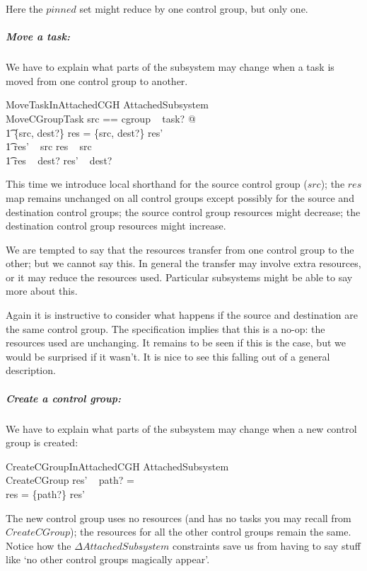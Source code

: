 \documentclass[a4paper,twoside,12pt]{article}
\begin{document}
Here the $pinned$ set might reduce by one control group, but only one.

\subparagraph{Move a task:}
We have to explain what parts of the subsystem may change when a task is moved from one control group to another.

\begin{schema}{MoveTaskInAttachedCGH}
\Delta AttachedSubsystem \\
MoveCGroupTask
\where
\LET src == cgroup ~ task? @ \\
\t1 \{src, dest?\} \ndres res = \{src, dest?\} \ndres res' \land \\
\t1 res' ~ src \subseteq res ~ src \land \\
\t1 res ~ dest? \subseteq res' ~ dest?
\end{schema}
This time we introduce local shorthand for the source control group ($src$);
the $res$ map remains unchanged on all control groups except possibly for the source and destination control groups;
the source control group resources might decrease;
the destination control group resources might increase.

We are tempted to say that the resources transfer from one control group to the other; but we cannot say this.
In general the transfer may involve extra resources, or it may reduce the resources used. Particular
subsystems might be able to say more about this.

Again it is instructive to consider what happens if the source and destination are the same control group. The specification implies that this is a no-op: the resources used are unchanging. It remains to be seen if this is the case,
but we would be surprised if it wasn't.  It is nice to see this falling out of a general description.

\subparagraph{Create a control group:}
We have to explain what parts of the subsystem may change when a new control group is created:

\begin{schema}{CreateCGroupInAttachedCGH}
\Delta AttachedSubsystem \\
CreateCGroup
\where
res' ~ path? = \emptyset \\
res = \{path?\} \ndres res'
\end{schema}
The new control group uses no resources (and has no tasks you may recall from $CreateCGroup$); the resources
for all the other control groups remain the same. Notice how the $\Delta AttachedSubsystem$ constraints save us
from having to say stuff like `no other control groups magically appear'.
\end{document}
